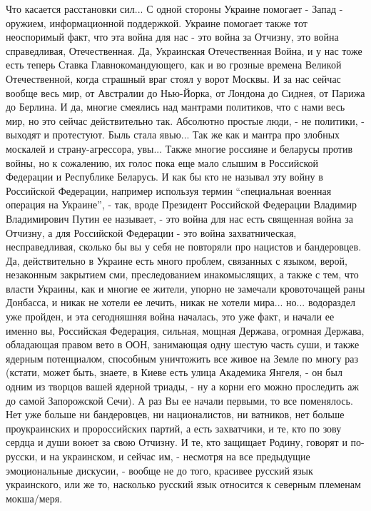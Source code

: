 Что касается расстановки сил... С одной стороны Украине помогает - Запад -
оружием, информационной поддержкой.  Украине помогает также тот неоспоримый
факт, что эта война для нас - это война за Отчизну, это война справедливая,
Отечественная. Да, Украинская Отечественная Война, и у нас тоже есть теперь
Ставка Главнокомандующего, как и во грозные времена Великой Отечественной,
когда страшный враг стоял у ворот Москвы.  И за нас сейчас вообще весь мир, от
Австралии до Нью-Йорка, от Лондона до Сиднея, от Парижа до Берлина. И да,
многие смеялись над мантрами политиков, что с нами весь мир, но это сейчас
действительно так. Абсолютно простые люди, - не политики, - выходят и
протестуют.  Быль стала явью... Так же как и мантра про злобных москалей и
страну-агрессора, увы...  Также многие россияне и беларусы против войны, но к
сожалению, их голос пока еще мало слышим в Российской Федерации и Республике
Беларусь. И как бы кто не называл эту войну в Российской Федерации, например
используя термин \enquote{cпециальная военная операция на Украине}, - так,
вроде Президент Российской Федерации Владимир Владимирович Путин ее называет, -
это война для нас есть священная война за Отчизну, а для Российской Федерации -
это война захватническая, несправедливая, сколько бы вы у себя не
повторяли про нацистов и бандеровцев. Да, действительно в Украине есть много
проблем, связанных с языком, верой, незаконным закрытием сми, преследованием
инакомыслящих, а также с тем, что власти Украины, как и многие ее жители,
упорно не замечали кровоточащей раны Донбасса, и никак не хотели ее лечить,
никак не хотели мира... но... водораздел уже пройден, и эта сегодняшняя война
началась, это уже факт, и начали ее именно вы, Российская Федерация, сильная,
мощная Держава, огромная Держава, обладающая правом вето в ООН, занимающая одну
шестую часть суши, и также ядерным потенциалом, способным уничтожить все живое
на Земле по многу раз (кстати, может быть, знаете, в Киеве есть улица Академика
Янгеля, - он был одним из творцов вашей ядерной триады, - ну а корни его можно
проследить аж до самой Запорожской Сечи). А раз Вы ее начали первыми, то все
поменялось.  Нет уже больше ни бандеровцев, ни националистов, ни ватников, нет
больше проукраинских и пророссийских партий, а есть захватчики, и те, кто по
зову сердца и души воюет за свою Отчизну. И те, кто защищает Родину, говорят и
по-русски, и на украинском, и сейчас им, - несмотря на все предыдущие
эмоциональные дискусии, - вообще не до того, красивее русский язык украинского,
или же то, насколько русский язык относится к северным племенам мокша/меря.

